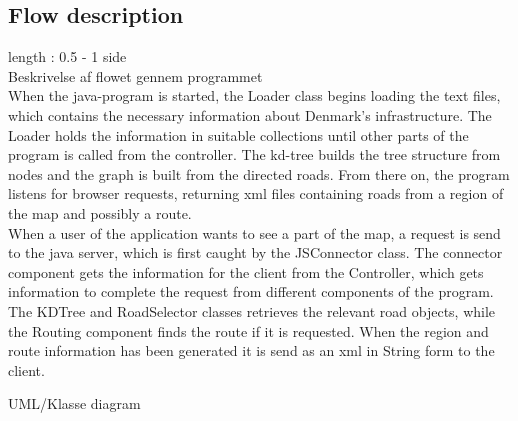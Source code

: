 \documentclass[a4paper,10pt,titlepage]{article}
\begin{document}
		\subsection{Flow description}
			length : 0.5 - 1 side\\
			Beskrivelse af flowet gennem programmet\\
			When the java-program is started, the Loader class begins loading the text files, which contains the necessary information about Denmark’s infrastructure. The Loader holds the information in suitable collections until other parts of the program is called from the controller. The kd-tree builds the tree structure from nodes and the graph is built from the directed roads. From there on, the program listens for browser requests, returning xml files containing roads from a region of the map and possibly a route.\\
When a user of the application wants to see a part of the map, a request is send to the java server, which is first caught by the JSConnector class.  The connector component gets the information for the client from the Controller, which gets information to complete the request from different components of the program. The KDTree and RoadSelector classes retrieves the relevant road objects, while the Routing component finds the route if it is requested. When the region and route information has been generated it is send as an xml in String form to the client. 

			UML/Klasse diagram\\
\end{document}
